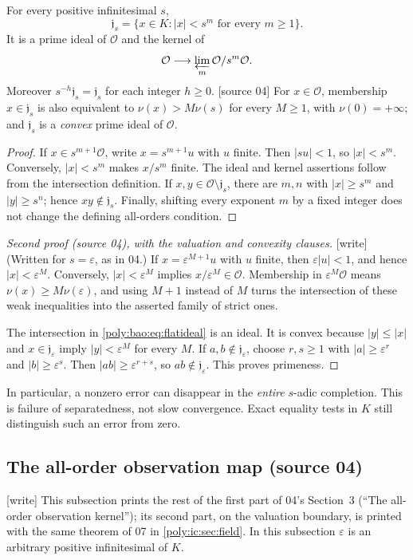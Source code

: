 \documentclass[11pt,a4paper]{article}
\numberwithin{equation}{section}
\theoremstyle{plain}
\newcommand{\wtag}{\textup{[write]}}%
\newcommand{\srcnote}[1]{\textup{[#1]}}%
\newcommand{\eps}{\varepsilon}
\newcommand{\OO}{\mathcal O}
\newcommand{\JJ}{\mathfrak j}
\begin{document}
\begin{lemma}\label{poly:ic:lem:flat}\label{poly:bao:lem:flat}
For every positive infinitesimal $s$,
\[
 \JJ_s=\{x\in K:|x|<s^m\text{ for every }m\geq1\}.
\]
It is a prime ideal of $\OO$ and the kernel of
\[
 \OO\longrightarrow\varprojlim_m\OO/s^m\OO.
\]
Moreover $s^{-h}\JJ_s=\JJ_s$ for each integer $h\geq0$.
\srcnote{source 04} For $x\in\OO$, membership $x\in\JJ_s$ is also
equivalent to $\nu(x)>M\nu(s)$ for every $M\geq1$, with $\nu(0)=+\infty$;
and $\JJ_s$ is a \emph{convex} prime ideal of $\OO$.
\end{lemma}
\begin{proof}
If $x\in s^{m+1}\OO$, write $x=s^{m+1}u$ with $u$ finite. Then
$|su|<1$, so $|x|<s^m$. Conversely, $|x|<s^m$ makes $x/s^m$ finite.
The ideal and kernel assertions follow from the intersection definition.
If $x,y\in\OO\setminus\JJ_s$, there are $m,n$ with
$|x|\geq s^m$ and $|y|\geq s^n$; hence $xy\notin\JJ_s$.
Finally, shifting every exponent $m$ by a fixed integer does not change
the defining all-orders condition.
\end{proof}
\begin{proof}[Second proof (source 04), with the valuation and convexity clauses]
\wtag{} (Written for $s=\eps$, as in 04.)
If $x=\eps^{M+1}u$ with $u$ finite, then $\eps|u|<1$, and hence
$|x|<\eps^M$. Conversely, $|x|<\eps^M$ implies $x/\eps^M\in\OO$.
Membership in $\eps^M\OO$ means $\nu(x)\geq M\nu(\eps)$, and using
$M+1$ instead of $M$ turns the intersection of these weak inequalities into
the asserted family of strict ones.

The intersection in \eqref{poly:bao:eq:flatideal} is an ideal. It is convex because
$|y|\leq|x|$ and $x\in\JJ_\eps$ imply $|y|<\eps^M$ for every $M$. If
$a,b\notin\JJ_\eps$, choose $r,s\geq1$ with
$|a|\geq\eps^r$ and $|b|\geq\eps^s$. Then
$|ab|\geq\eps^{r+s}$, so $ab\notin\JJ_\eps$. This proves primeness.
\end{proof}

In particular, a nonzero error can disappear in the \emph{entire}
$s$-adic completion. This is failure of separatedness, not slow convergence.
Exact equality tests in $K$ still distinguish such an error from zero.

\subsection{The all-order observation map (source 04)}\label{poly:bao:sec:flat}
\wtag{} This subsection prints the rest of the first part of 04's Section~3
(``The all-order observation kernel''); its second part, on the valuation
boundary, is printed with the same theorem of 07 in \cref{poly:ic:sec:field}.
In this subsection $\eps$ is an arbitrary positive infinitesimal of $K$.
\end{document}
